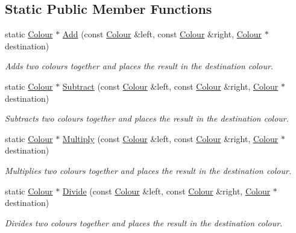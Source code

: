 \subsection*{Static Public Member Functions}
\begin{DoxyCompactItemize}
\item 
static \hyperlink{class_flounder_1_1_colour}{Colour} $\ast$ \hyperlink{class_flounder_1_1_colour_a3794da84380a1e65b8a8c6d02c273cd4}{Add} (const \hyperlink{class_flounder_1_1_colour}{Colour} \&left, const \hyperlink{class_flounder_1_1_colour}{Colour} \&right, \hyperlink{class_flounder_1_1_colour}{Colour} $\ast$destination)
\begin{DoxyCompactList}\small\item\em Adds two colours together and places the result in the destination colour. \end{DoxyCompactList}\item 
static \hyperlink{class_flounder_1_1_colour}{Colour} $\ast$ \hyperlink{class_flounder_1_1_colour_adac2e9bb9d28cc0bff1cd9de3ac6180a}{Subtract} (const \hyperlink{class_flounder_1_1_colour}{Colour} \&left, const \hyperlink{class_flounder_1_1_colour}{Colour} \&right, \hyperlink{class_flounder_1_1_colour}{Colour} $\ast$destination)
\begin{DoxyCompactList}\small\item\em Subtracts two colours together and places the result in the destination colour. \end{DoxyCompactList}\item 
static \hyperlink{class_flounder_1_1_colour}{Colour} $\ast$ \hyperlink{class_flounder_1_1_colour_ad07bbfc4a5c56a37adaf99947c88c71b}{Multiply} (const \hyperlink{class_flounder_1_1_colour}{Colour} \&left, const \hyperlink{class_flounder_1_1_colour}{Colour} \&right, \hyperlink{class_flounder_1_1_colour}{Colour} $\ast$destination)
\begin{DoxyCompactList}\small\item\em Multiplies two colours together and places the result in the destination colour. \end{DoxyCompactList}\item 
static \hyperlink{class_flounder_1_1_colour}{Colour} $\ast$ \hyperlink{class_flounder_1_1_colour_aa576ba31fa4dda753b17b0fe1d052eb7}{Divide} (const \hyperlink{class_flounder_1_1_colour}{Colour} \&left, const \hyperlink{class_flounder_1_1_colour}{Colour} \&right, \hyperlink{class_flounder_1_1_colour}{Colour} $\ast$destination)
\begin{DoxyCompactList}\small\item\em Divides two colours together and places the result in the destination colour. \end{DoxyCompactList}\item 

\end{DoxyCompactItemize}
